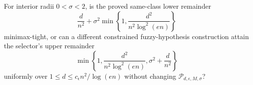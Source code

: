 For interior radii \(0<\sigma<2\), is the proved same-class lower remainder
\[
 \frac d{n^2}+\sigma^2\min\left\{1,\frac{d^2}{n^2\log^2(en)}\right\}
\]
minimax-tight, or can a different constrained fuzzy-hypothesis construction attain the selector's upper remainder
\[
 \min\left\{1,\frac{d^2}{n^2\log^2(en)},\sigma^2+\frac d{n^2}\right\}
\]
uniformly over \(1\le d\le c_{\epsilon}n^2/\log(en)\) without changing \(\mathcal P_{d,\epsilon,M,\sigma}\)?